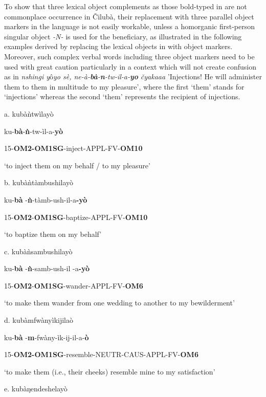 \documentclass[output=paper]{langscibook}
\begin{document}
To show that three lexical object complements as those bold-typed in  are not commonplace occurrence in Čilubà, their replacement with three parallel object markers in the language is not easily workable, unless a homorganic first-person singular object \textit{{}-N-} is used for the beneficiary, as illustrated in the following examples derived by replacing the lexical objects in  with object markers. Moreover, such complex verbal words including three object markers need to be used with great caution particularly in a context which will not create confusion as in \textit{nshingi y}{ô}\textit{yo sè, ne-à-}\textbf{\textit{bà}}\textit{{}-}\textbf{\textit{n}}\textit{{}-tw-il-a-}\textbf{\textit{yo}} \textit{čyakaaa} ’Injections! He will administer them to them in multitude to my pleasure’, where the first ‘them’ stands for ‘injections’ whereas the second ‘them’ represents the recipient of injections.

\ea%
    \label{ex:lukusa:30}
    \z

          a.  kubà{ǹtwìlayò}

ku-\textbf{bà}{}-{\textbf{ǹ}{}-tw-ìl-a-\textbf{yò}}

{15-\textbf{OM2-OM1SG}{}-inject-APPL-FV-\textbf{OM10}}

{‘to inject them on my behalf / to my pleasure’}

b.  kubà{ǹtàmbushilayò}

ku-\textbf{bà}  {}-{\textbf{ǹ}{}-tàmb-ush-il-a\textbf{{}-yò}}

15-\textbf{OM2}{}-\textbf{OM1SG}{}-baptize-APPL-FV-\textbf{OM10}

\glt ‘to baptize them on my behalf’

c.  kubà{ǹsambushilayò}

ku-\textbf{bà}  {}-{\textbf{ǹ}{}-samb-ush-il  {}-a\textbf{{}-yò}}

15-\textbf{OM2}{}-\textbf{OM1SG}{}-wander-APPL-FV-\textbf{OM6}

\glt ‘to make them wander from one wedding to another to my bewilderment’

d.  kubà{mfwànyìkijilaò}

ku-\textbf{bà}  {}-{\textbf{m}{}-fwàny-ìk-ij-il-a-\textbf{ò}}

{15-\textbf{OM2-OM1SG}{}-resemble-NEUTR-CAUS-APPL-FV-\textbf{OM6}}

{‘to make them (i.e., their cheeks) resemble mine to my satisfaction’}

e.  kubàŋ{endeshelayò}
\end{document}
